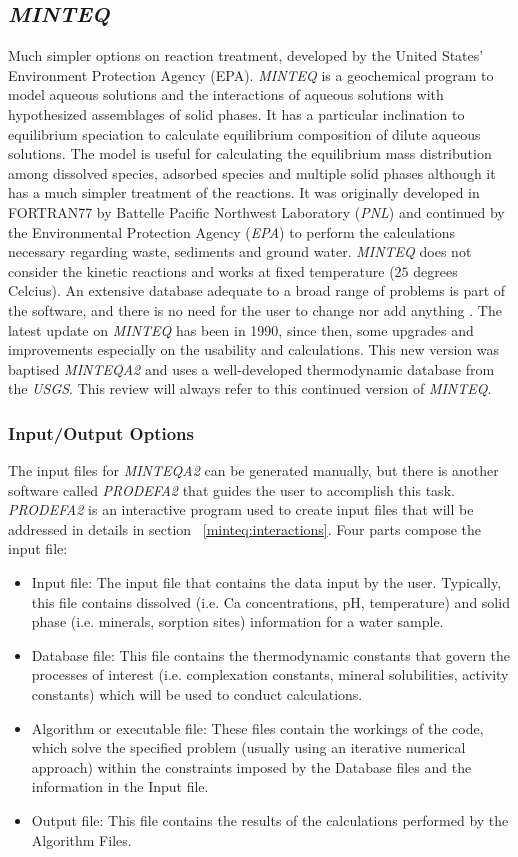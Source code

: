 \documentclass[ppgc,mestrado,English]{iiufrgs}
\begin{document}
\subsection{\emph{MINTEQ}}
Much simpler options on reaction treatment, developed by the United States' Environment Protection Agency (EPA).  \emph{MINTEQ} is a geochemical program to model aqueous solutions and the interactions of aqueous solutions with hypothesized assemblages of solid phases. It has a particular inclination to equilibrium speciation to calculate equilibrium composition of dilute aqueous solutions. The model is useful for calculating the equilibrium mass distribution among dissolved species, adsorbed species and multiple solid phases although it has a much simpler treatment of the reactions. 
It was originally developed in FORTRAN77 by Battelle Pacific Northwest Laboratory (\emph{PNL}) and continued by the Environmental Protection Agency (\emph{EPA}) to perform the calculations necessary regarding waste, sediments and ground water. \emph{MINTEQ} does not consider the kinetic reactions and works at fixed temperature ($25$ degrees Celcius). 
An extensive database adequate to a broad range of problems is part of the software, and there is no need for the user to change nor add anything \cite{Brown:87} \cite{Allison:91}. The latest update on \emph{MINTEQ} has been in 1990, since then, some upgrades and improvements especially on the usability and calculations. 
This new version was baptised \emph{MINTEQA2} and uses a well-developed thermodynamic database from the \emph{USGS}. This review will always refer to this continued version of \emph{MINTEQ}.

\subsubsection{Input/Output Options}
The input files for \emph{MINTEQA2} can be generated manually, but there is another software called \emph{PRODEFA2} that guides the user to accomplish this task. \emph{PRODEFA2} is an interactive program used to create input files that will be addressed in details in section ~\ref{minteq:interactions}. Four parts compose the input file:
\begin{itemize}
\item Input file: The input file that contains the data input by the user. Typically, this file contains dissolved (i.e. Ca concentrations, pH, temperature) and solid phase (i.e. minerals, sorption sites) information for a water sample.
\item Database file: This file contains the thermodynamic constants that govern the processes of interest (i.e. complexation constants, mineral solubilities, activity constants) which will be used to conduct calculations.
\item Algorithm or executable file:  These files contain the workings of the code, which solve the specified problem (usually using an iterative numerical approach) within the constraints imposed by the Database files and the information in the Input file.
\item Output file: This file contains the results of the calculations performed by the Algorithm Files.
\end{itemize}
\end{document}
